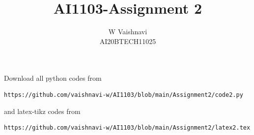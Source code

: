 \documentclass[journal,12pt,twocolumn]{IEEEtran}
\DeclareMathOperator*{\Res}{Res}
\begin{document}
\newcommand{\BEQA}{\begin{eqnarray}}
\newcommand{\EEQA}{\end{eqnarray}}
\newcommand{\define}{\stackrel{\triangle}{=}}

\raggedbottom
\setlength{\parindent}{0pt}
\providecommand{\mbf}{\mathbf}
\providecommand{\pr}[1]{\ensuremath{\Pr\left(#1\right)}}
\providecommand{\qfunc}[1]{\ensuremath{Q\left(#1\right)}}
\providecommand{\sbrak}[1]{\ensuremath{{}\left[#1\right]}}
\providecommand{\lsbrak}[1]{\ensuremath{{}\left[#1\right.}}
\providecommand{\rsbrak}[1]{\ensuremath{{}\left.#1\right]}}
\providecommand{\brak}[1]{\ensuremath{\left(#1\right)}}
\providecommand{\lbrak}[1]{\ensuremath{\left(#1\right.}}
\providecommand{\rbrak}[1]{\ensuremath{\left.#1\right)}}
\providecommand{\cbrak}[1]{\ensuremath{\left\{#1\right\}}}
\providecommand{\lcbrak}[1]{\ensuremath{\left\{#1\right.}}
\providecommand{\rcbrak}[1]{\ensuremath{\left.#1\right\}}}
\theoremstyle{remark}
\newtheorem{rem}{Remark}
\newcommand{\sgn}{\mathop{\mathrm{sgn}}}
\providecommand{\abs}[1]{\vert#1\vert}
\providecommand{\res}[1]{\Res\displaylimits_{#1}} 
\providecommand{\norm}[1]{\lVert#1\rVert}
\providecommand{\mtx}[1]{\mathbf{#1}}
\providecommand{\mean}[1]{E[ #1 ]}
\providecommand{\fourier}{\overset{\mathcal{F}}{ \rightleftharpoons}}
\providecommand{\system}{\overset{\mathcal{H}}{ \longleftrightarrow}}
\newcommand{\solution}{\noindent \textbf{Solution: }}
\newcommand{\cosec}{\,\text{cosec}\,}
\providecommand{\dec}[2]{\ensuremath{\overset{#1}{\underset{#2}{\gtrless}}}}
\newcommand{\myvec}[1]{\ensuremath{\begin{pmatrix}#1\end{pmatrix}}}
\newcommand{\mydet}[1]{\ensuremath{\begin{vmatrix}#1\end{vmatrix}}}
\makeatletter
{}
\makeatother
\let\StandardTheFigure\thefigure
\let\vec\mathbf
\renewcommand{\thefigure}{\theproblem}
\def\putbox#1#2#3{\makebox[0in][l]{\makebox[#1][l]{}\raisebox{\baselineskip}[0in][0in]{\raisebox{#2}[0in][0in]{#3}}}}
     \def\rightbox#1{\makebox[0in][r]{#1}}
     \def\centbox#1{\makebox[0in]{#1}}
     \def\topbox#1{\raisebox{-\baselineskip}[0in][0in]{#1}}
     \def\midbox#1{\raisebox{-0.5\baselineskip}[0in][0in]{#1}}
\vspace{3cm}
\title{AI1103-Assignment 2}
\author{W Vaishnavi\\AI20BTECH11025}
\maketitle
\newpage
\bigskip
\renewcommand{\thefigure}{\theenumi}
\renewcommand{\thetable}{\theenumi}
Download all python codes from 
\begin{lstlisting}
https://github.com/vaishnavi-w/AI1103/blob/main/Assignment2/code2.py
\end{lstlisting}
%
and latex-tikz codes from 
%
\begin{lstlisting}
https://github.com/vaishnavi-w/AI1103/blob/main/Assignment2/latex2.tex
\end{lstlisting}
\end{document}

